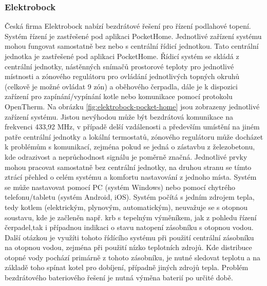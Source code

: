 \subsubsection{Elektrobock}
Česká firma Elektrobock nabízí bezdrátové řešení pro řízení podlahové topení. Systém řízení je zastřešené pod aplikaci PocketHome. Jednotlivé zařízení systému mohou fungovat samostatně bez nebo s centrální řídicí jednotkou. Tato centrální jednotka je zastřešené pod aplikaci PocketHome. Řídicí systém se skládá z centrální jednotky, nástěnných snímačů prostorové teploty pro jednotlivé místnosti a zónového regulátoru pro ovládání jednotlivých topných okruhů (celkově je možné ovládat 9 zón) a oběhového čerpadla, dále je k dispozici zařízení pro zapínání/vypínání kotle nebo komunikace pomocí protokolu OpenTherm. Na obrázku \ref{fig:elektrobock-pocket-home} jsou zobrazeny jednotlivé zařízení systému. Jistou nevýhodou může být bezdrátová komunikace na frekvenci 433,92 MHz, v případě delší vzdálenosti a především umístění na jiném patře centrální jednotky a lokální termostatů, zónového regulátoru může docházet k problémům s komunikací, zejména pokud se jedná o zástavbu z železobetonu, kde odrazivost a neprůchodnost signálu je poměrně značná. Jednotlivé prvky mohou pracovat samostatně bez centrální jednotky, na druhou stranu se tímto ztrácí přehled o celém systému a komfortu nastavování z jednoho místa. Systém se může nastavovat pomocí PC (systém Windows) nebo pomocí chytrého telefonu/tabletu (systém Android, iOS). Systém počítá s jedním zdrojem tepla, tedy kotlem (elektrickým, plynovým, automatickým), neuvažuje se s otopnou soustavu, kde je začleněn např. krb s tepelným výměníkem, jak z pohledu řízení čerpadel,tak i případnou indikaci o stavu natopení zásobníku s otopnou vodou. Další otázkou je využíti tohoto řídícího systému při použití centrální zásobníku na otopnou vodou, zejména při použití nízko teplotních zdrojů. Kde distribuce otopné vody pochází primárně z tohoto zásobníku, je nutné sledovat teplotu  a na základě toho spínat kotel pro dobíjení, případně jiných zdrojů tepla. Problém bezdrátového bateriového řešení je nutná výměna baterií po určité době.


